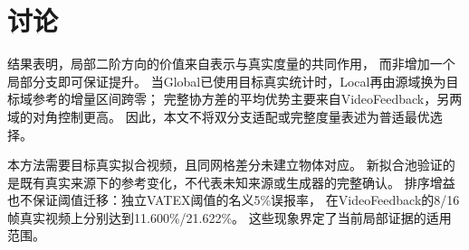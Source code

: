 \section{讨论}
\label{sec:discussion}

结果表明，局部二阶方向的价值来自表示与真实度量的共同作用，
而非增加一个局部分支即可保证提升。
当Global已使用目标真实统计时，Local再由源域换为目标域参考的增量区间跨零；
完整协方差的平均优势主要来自VideoFeedback，另两域的对角控制更高。
因此，本文不将双分支适配或完整度量表述为普适最优选择。

本方法需要目标真实拟合视频，且同网格差分未建立物体对应。
新拟合池验证的是既有真实来源下的参考变化，不代表未知来源或生成器的完整确认。
排序增益也不保证阈值迁移：独立VATEX阈值的名义5\%误报率，
在VideoFeedback的8/16帧真实视频上分别达到11.600\%/21.622\%。
这些现象界定了当前局部证据的适用范围。
